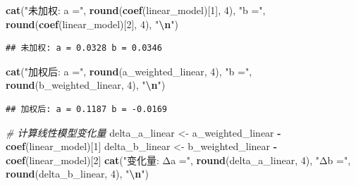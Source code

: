 \documentclass[
]{article}
\newenvironment{Shaded}{\begin{snugshade}}{\end{snugshade}}
\newcommand{\CommentTok}[1]{\textcolor[rgb]{0.56,0.35,0.01}{\textit{#1}}}
\newcommand{\DecValTok}[1]{\textcolor[rgb]{0.00,0.00,0.81}{#1}}
\newcommand{\FunctionTok}[1]{\textcolor[rgb]{0.13,0.29,0.53}{\textbf{#1}}}
\newcommand{\NormalTok}[1]{#1}
\newcommand{\OtherTok}[1]{\textcolor[rgb]{0.56,0.35,0.01}{#1}}
\newcommand{\SpecialCharTok}[1]{\textcolor[rgb]{0.81,0.36,0.00}{\textbf{#1}}}
\newcommand{\StringTok}[1]{\textcolor[rgb]{0.31,0.60,0.02}{#1}}
\begin{document}
\begin{Shaded}
\begin{Highlighting}[]
\FunctionTok{cat}\NormalTok{(}\StringTok{"未加权: a ="}\NormalTok{, }\FunctionTok{round}\NormalTok{(}\FunctionTok{coef}\NormalTok{(linear\_model)[}\DecValTok{1}\NormalTok{], }\DecValTok{4}\NormalTok{), }\StringTok{"b ="}\NormalTok{, }\FunctionTok{round}\NormalTok{(}\FunctionTok{coef}\NormalTok{(linear\_model)[}\DecValTok{2}\NormalTok{], }\DecValTok{4}\NormalTok{), }\StringTok{"}\SpecialCharTok{\textbackslash{}n}\StringTok{"}\NormalTok{)}
\end{Highlighting}
\end{Shaded}

\begin{verbatim}
## 未加权: a = 0.0328 b = 0.0346
\end{verbatim}

\begin{Shaded}
\begin{Highlighting}[]
\FunctionTok{cat}\NormalTok{(}\StringTok{"加权后: a ="}\NormalTok{, }\FunctionTok{round}\NormalTok{(a\_weighted\_linear, }\DecValTok{4}\NormalTok{), }\StringTok{"b ="}\NormalTok{, }\FunctionTok{round}\NormalTok{(b\_weighted\_linear, }\DecValTok{4}\NormalTok{), }\StringTok{"}\SpecialCharTok{\textbackslash{}n}\StringTok{"}\NormalTok{)}
\end{Highlighting}
\end{Shaded}

\begin{verbatim}
## 加权后: a = 0.1187 b = -0.0169
\end{verbatim}

\begin{Shaded}
\begin{Highlighting}[]
\CommentTok{\# 计算线性模型变化量}
\NormalTok{delta\_a\_linear }\OtherTok{\textless{}{-}}\NormalTok{ a\_weighted\_linear }\SpecialCharTok{{-}} \FunctionTok{coef}\NormalTok{(linear\_model)[}\DecValTok{1}\NormalTok{]}
\NormalTok{delta\_b\_linear }\OtherTok{\textless{}{-}}\NormalTok{ b\_weighted\_linear }\SpecialCharTok{{-}} \FunctionTok{coef}\NormalTok{(linear\_model)[}\DecValTok{2}\NormalTok{]}
\FunctionTok{cat}\NormalTok{(}\StringTok{"变化量: Δa ="}\NormalTok{, }\FunctionTok{round}\NormalTok{(delta\_a\_linear, }\DecValTok{4}\NormalTok{), }\StringTok{"Δb ="}\NormalTok{, }\FunctionTok{round}\NormalTok{(delta\_b\_linear, }\DecValTok{4}\NormalTok{), }\StringTok{"}\SpecialCharTok{\textbackslash{}n}\StringTok{"}\NormalTok{)}
\end{Highlighting}
\end{Shaded}
\end{document}

